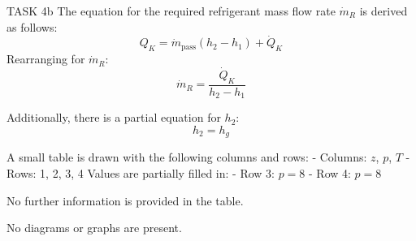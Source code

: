 TASK 4b  
The equation for the required refrigerant mass flow rate \( \dot{m}_R \) is derived as follows:  
\[
Q_K = \dot{m}_{\text{pass}} (h_2 - h_1) + \dot{Q}_K
\]  
Rearranging for \( \dot{m}_R \):  
\[
\dot{m}_R = \frac{\dot{Q}_K}{h_2 - h_1}
\]  

Additionally, there is a partial equation for \( h_2 \):  
\[
h_2 = h_g
\]  

A small table is drawn with the following columns and rows:  
- Columns: \( z \), \( p \), \( T \)  
- Rows: 1, 2, 3, 4  
Values are partially filled in:  
- Row 3: \( p = 8 \)  
- Row 4: \( p = 8 \)  

No further information is provided in the table.  

No diagrams or graphs are present.
